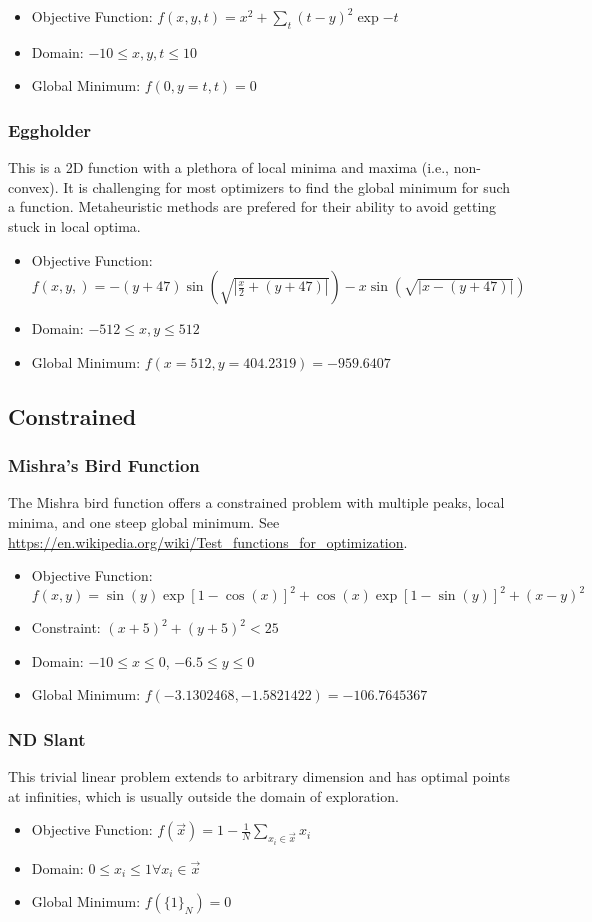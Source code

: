 \begin{itemize}
  \item Objective Function: $f(x,y,t) = x^2 + \sum_{t} (t-y)^2 \exp{-t}$
  \item Domain: $-10 \leq x,y,t \leq 10$
  \item Global Minimum: $f(0,y=t,t) = 0$
\end{itemize}

\subsubsection{Eggholder}
This is a 2D function with a plethora of local minima and maxima (i.e., non-convex). It is challenging for most optimizers to find the global minimum for such a function. Metaheuristic methods are prefered for their ability to avoid getting stuck in local optima.

\begin{itemize}
	\item Objective Function: $f(x,y,) =-(y+47) \sin(\sqrt{|\frac{x}{2}+(y+47)|}) - x\sin(\sqrt{|x - (y+47)|})$
	\item Domain: $-512 \leq x,y \leq 512$
	\item Global Minimum: $f(x=512, y=404.2319) = -959.6407$
\end{itemize}

\subsection{Constrained}
\subsubsection{Mishra's Bird Function}
The Mishra bird function offers a constrained problem with multiple peaks, local minima, and one steep global
minimum.
See \url{https://en.wikipedia.org/wiki/Test_functions_for_optimization}.

\begin{itemize}
  \item Objective Function: $f(x,y) = \sin(y)\exp[1-\cos(x)]^2 + \cos(x)\exp[1-\sin(y)]^2 + (x-y)^2$
  \item Constraint: $(x+5)^2 + (y+5)^2 < 25$
  \item Domain: $-10 \leq x \leq 0$, $-6.5 \leq y \leq 0$
  \item Global Minimum: $f(-3.1302468, -1.5821422) = -106.7645367$
\end{itemize}

\subsubsection{ND Slant}
This trivial linear problem extends to arbitrary dimension and has optimal points at infinities,
which is usually outside the domain of exploration.
\begin{itemize}
  \item Objective Function: $f(\vec x) = 1 - \frac{1}{N}\sum_{x_i\in \vec x} x_i$
  \item Domain: $0 \leq x_i \leq 1 \forall x_i \in \vec x$
  \item Global Minimum: $f(\{1\}_N) = 0$
\end{itemize}

